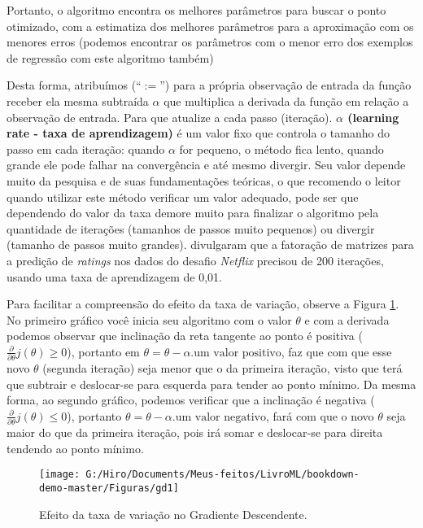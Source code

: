 \documentclass[
  openany]{book}
\begin{document}
Portanto, o algoritmo encontra os melhores parâmetros para buscar o ponto otimizado, com a estimatiza dos melhores parâmetros para a aproximação com os menores erros (podemos encontrar os parâmetros com o menor erro dos exemplos de regressão com este algoritmo também)

Desta forma, atribuímos (``\(:=\)'') para a própria observação de entrada da função receber ela mesma subtraída \(\alpha\) que multiplica a derivada da função em relação a observação de entrada. Para que atualize a cada passo (iteração). \textbf{\(\alpha\) (learning rate - taxa de aprendizagem)} é um valor fixo que controla o tamanho do passo em cada iteração: quando \(\alpha\) for pequeno, o método fica lento, quando grande ele pode falhar na convergência e até mesmo divergir. Seu valor depende muito da pesquisa e de suas fundamentações teóricas, o que recomendo o leitor quando utilizar este método verificar um valor adequado, pode ser que dependendo do valor da taxa demore muito para finalizar o algoritmo pela quantidade de iterações (tamanhos de passos muito pequenos) ou divergir (tamanho de passos muito grandes). \citet{rendle2008online} divulgaram que a fatoração de matrizes para a predição de \emph{ratings} nos dados do desafio \emph{Netflix} precisou de 200 iterações, usando uma taxa de aprendizagem de 0,01.

Para facilitar a compreensão do efeito da taxa de variação, observe a Figura \ref{fig:gd1}. No primeiro gráfico você inicia seu algoritmo com o valor \(\theta\) e com a derivada podemos observar que inclinação da reta tangente ao ponto é positiva (\(\frac{\partial}{\partial\theta}j(\theta)\geq 0\)), portanto em \(\theta=\theta-\alpha.\mbox{um valor positivo}\), faz que com que esse novo \(\theta\) (segunda iteração) seja menor que o da primeira iteração, visto que terá que subtrair e deslocar-se para esquerda para tender ao ponto mínimo. Da mesma forma, ao segundo gráfico, podemos verificar que a inclinação é negativa (\(\frac{\partial}{\partial\theta}j(\theta)\leq 0\)), portanto \(\theta=\theta-\alpha.\mbox{um valor negativo}\), fará com que o novo \(\theta\) seja maior do que da primeira iteração, pois irá somar e deslocar-se para direita tendendo ao ponto mínimo.

\begin{figure}

{\centering \texttt{[image: G:/Hiro/Documents/Meus-feitos/LivroML/bookdown-demo-master/Figuras/gd1]} 

}

\caption{Efeito da taxa de variação no Gradiente Descendente.}\label{fig:gd1}
\end{figure}
\end{document}
